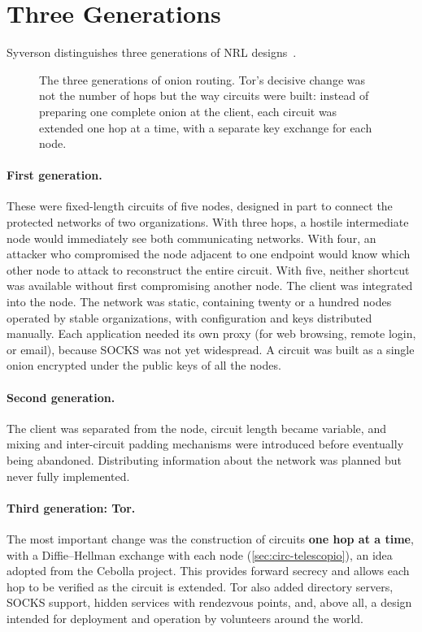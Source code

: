\section{Three Generations}\label{sec:nascita-generazioni}

Syverson distinguishes three generations of NRL designs~\cite{syverson2011peel}.

\begin{figure}[htbp]
\centering

\caption{The three generations of onion routing. Tor's decisive change was not the number of hops but the way circuits were built: instead of preparing one complete onion at the client, each circuit was extended one hop at a time, with a separate key exchange for each node.}
\label{fig:generazioni}
\end{figure}

\paragraph{First generation.} These were fixed-length circuits of five nodes, designed in part to connect the protected networks of two organizations. With three hops, a hostile intermediate node would immediately see both communicating networks. With four, an attacker who compromised the node adjacent to one endpoint would know which other node to attack to reconstruct the entire circuit. With five, neither shortcut was available without first compromising another node. The client was integrated into the node. The network was static, containing twenty or a hundred nodes operated by stable organizations, with configuration and keys distributed manually. Each application needed its own proxy (for web browsing, remote login, or email), because SOCKS was not yet widespread. A circuit was built as a single onion encrypted under the public keys of all the nodes.

\paragraph{Second generation.} The client was separated from the node, circuit length became variable, and mixing and inter-circuit padding mechanisms were introduced before eventually being abandoned. Distributing information about the network was planned but never fully implemented.

\paragraph{Third generation: Tor.} The most important change was the construction of circuits \textbf{one hop at a time}, with a Diffie--Hellman exchange with each node (\cref{sec:circ-telescopio}), an idea adopted from the Cebolla project. This provides forward secrecy and allows each hop to be verified as the circuit is extended. Tor also added directory servers, SOCKS support, hidden services with rendezvous points, and, above all, a design intended for deployment and operation by volunteers around the world.

